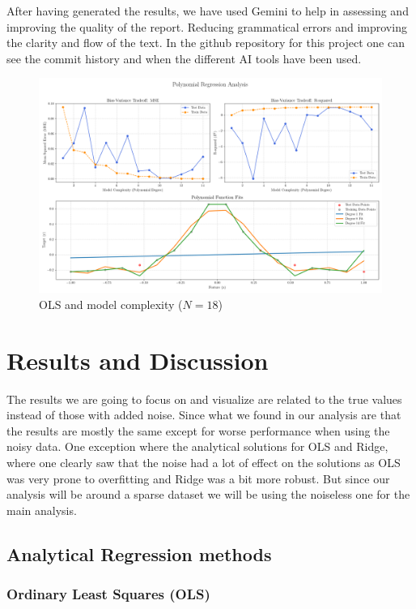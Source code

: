 \documentclass[twocolumn,aps]{revtex4}
\begin{document}
After having generated the results, we have used Gemini to help in assessing and improving the quality of the report.
Reducing grammatical errors and improving the clarity and flow of the text.
In the github repository for this project one can see the commit history and when the different AI tools have been used.
\begin{figure}[t]
    \centering  
    \includegraphics[width=.95 \linewidth]{Figures/Combined_Analysis_OLS.png}
    \caption{OLS and model complexity ($N=18$)}
    \label{fig:OLS1}
\end{figure}
\section{Results and Discussion}\label{section:results}
The results we are going to focus on and visualize are related to the true values instead of those with added noise. 
Since what we found in our analysis are that the results are mostly the same except for worse performance when using the noisy data.
One exception where the analytical solutions for OLS and Ridge, where one clearly saw that the noise had a lot of effect on the solutions as OLS was very prone to overfitting and Ridge was a bit more robust.
But since our analysis will be around a sparse dataset we will be using the noiseless one for the main analysis.

\subsection{Analytical Regression methods}

\subsubsection{Ordinary Least Squares (OLS)}
\end{document}
